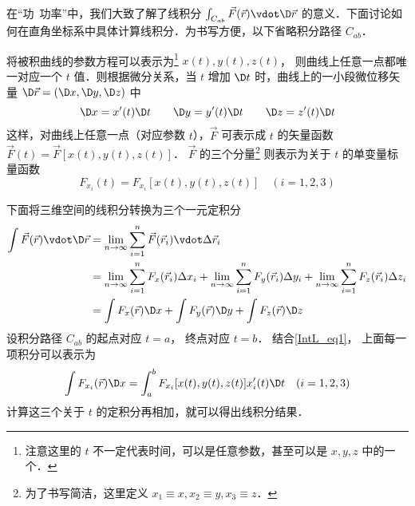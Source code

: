 

在“功\ 功率”中，我们大致了解了线积分 $\int_{C_{ab}} {\vec F(\vec r) \vdot \D\vec r} $ 的意义．下面讨论如何在直角坐标系中具体计算线积分．为书写方便，以下省略积分路径 $C_{ab}$． 

将被积曲线的参数方程可以表示为\footnote{注意这里的 $t$ 不一定代表时间，可以是任意参数，甚至可以是 $x,y,z$ 中的一个．} $x(t),y(t),z(t)$， 则曲线上任意一点都唯一对应一个 $t$ 值．则根据微分关系，当 $t$ 增加 $\D t$ 时，曲线上的一小段微位移矢量 $\D \vec r = (\D x,\D y,\D z)$ 中
\begin{equation}\label{IntL_eq1}
\D x = x'(t)\D t \qquad \D y = y'(t)\D t \qquad \D z = z'(t)\D t
\end{equation}
这样，对曲线上任意一点（对应参数 $t$），$\vec F$ 可表示成 $t$ 的矢量函数 $\vec F(t) = \vec F[x(t),y(t),z(t)]$．  $\vec F$ 的三个分量\footnote{为了书写简洁，这里定义 $x_1\equiv x, x_2\equiv y,x_3\equiv z$．} 则表示为关于 $t$ 的单变量标量函数
\begin{equation}
{F_{x_i}}(t) = {F_{x_i}}[x(t),y(t),z(t)] \quad (i = 1,2,3)
\end{equation}

下面将三维空间的线积分转换为三个一元定积分
\begin{equation}\begin{aligned}
\int {\vec F(\vec r) \vdot \D \vec r}  &= \lim \limits_{n \to \infty } \sum\limits_{i = 1}^n {\vec F({{\vec r}_i}) \vdot \Delta {{\vec r}_i}} \\
&= \lim_{n \to \infty } \sum_{i = 1}^n {{F_x}({{\vec r}_i})\Delta {x_i} + \lim_{n \to \infty } \sum_{i = 1}^n {F_y}({{\vec r}_i})\Delta{y_i} + \lim_{n \to \infty } \sum_{i = 1}^n {F_z}({{\vec r}_i})\Delta{z_i}} \\
&= \int {{F_x}(\vec r)\D x}  + \int {{F_y}(\vec r)\D y}  + \int {{F_z}(\vec r)\D z} 
\end{aligned}\end{equation} 
设积分路径 ${C_{ab}}$ 的起点对应 $t = a$， 终点对应 $t = b$． 结合\autoref{IntL_eq1}， 上面每一项积分可以表示为 
\begin{equation}\label{IntL_eq4}
\int {{F_{x_i}}(\vec r) \D x}  = \int_a^b {{F_{x_i}}[x(t),y(t),z(t)] x_i'(t)\D t} \quad (i=1,2,3)
\end{equation} 
计算这三个关于 $t$ 的定积分再相加，就可以得出线积分结果．

